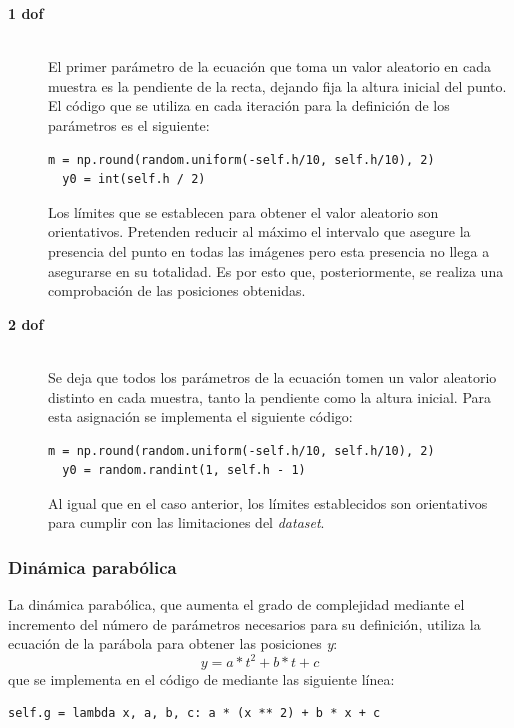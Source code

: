 \begin{description}
\item[\textbf{1 \acrshort{dof}}] \hfill 
\vspace{10pt}
\\
El primer parámetro de la ecuación que toma un valor aleatorio en cada muestra es la pendiente de la recta, dejando fija la altura inicial del punto. El código que se utiliza en cada iteración para la definición de los parámetros es el siguiente:
\vspace{10pt}
\begin{lstlisting}[frame=single]
  m = np.round(random.uniform(-self.h/10, self.h/10), 2)
  y0 = int(self.h / 2)
\end{lstlisting}
Los límites que se establecen para obtener el valor aleatorio son orientativos. Pretenden reducir al máximo el intervalo que asegure la presencia del punto en todas las imágenes pero esta presencia no llega a asegurarse en su totalidad. Es por esto que, posteriormente, se realiza una comprobación de las posiciones obtenidas.
\vspace{10pt}
	
\item[\textbf{2 \acrshort{dof}}] \hfill 
\vspace{10pt}
\\
Se deja que todos los parámetros de la ecuación tomen un valor aleatorio distinto en cada muestra, tanto la pendiente como la altura inicial. Para esta asignación se implementa el siguiente código:
\vspace{10pt}
\begin{lstlisting}[frame=single]
  m = np.round(random.uniform(-self.h/10, self.h/10), 2)
  y0 = random.randint(1, self.h - 1)
\end{lstlisting}
Al igual que en el caso anterior, los límites establecidos son orientativos para cumplir con las limitaciones del \textit{dataset}.
\vspace{10pt}

\end{description}

\subsubsection{Dinámica parabólica}

La dinámica parabólica, que aumenta el grado de complejidad mediante el incremento del número de parámetros necesarios para su definición, utiliza la ecuación de la parábola para obtener las posiciones \textit{y}:
$$y = a*t^2 + b*t + c$$
que se implementa en el código de mediante las siguiente línea:
\vspace{10pt}
\begin{lstlisting}[frame=single]
  self.g = lambda x, a, b, c: a * (x ** 2) + b * x + c
\end{lstlisting}

